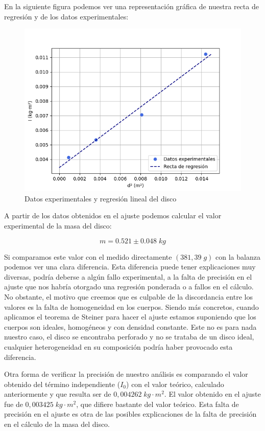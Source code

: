 \documentclass[a4paper,12pt,titlepage]{report}
\begin{document}
En la siguiente figura podemos ver una representación gráfica de nuestra recta de regresión y de los datos experimentales:

\begin{figure}[h!]
    \centering
    \includegraphics[width=0.85\linewidth]{Images/regSteiner1.png}
    \caption{Datos experimentales y regresión lineal del disco}
\end{figure}

A partir de los datos obtenidos en el ajuste podemos calcular el valor experimental de la masa del disco:

\begin{equation}
    m = 0.521 \pm 0.048 \; kg
\end{equation}

Si comparamos este valor con el medido directamente $(381,39 \;g)$ con la balanza podemos ver una clara diferencia. Esta diferencia puede tener explicaciones muy diversas, podría deberse a algún fallo experimental, a la falta de precisión en el ajuste que nos habría otorgado una regresión ponderada o a fallos en el cálculo. No obstante, el motivo que creemos que es culpable de la discordancia entre los valores es la falta de homogeneidad en los cuerpos. Siendo más concretos, cuando aplicamos el teorema de Steiner para hacer el ajuste estamos suponiendo que los cuerpos son ideales, homogéneos y con densidad constante. Este no es para nada nuestro caso, el disco se encontraba perforado y no se trataba de un disco ideal, cualquier heterogeneidad en su composición podría haber provocado esta diferencia.

\par Otra forma de verificar la precisión de nuestro análisis es comparando el valor obtenido del término independiente ($I_0$) con el valor teórico, calculado anteriormente y que resulta ser de $0,004262 \; kg \cdot m^2$. El valor obtenido en el ajuste fue de $0,003425 \; kg \cdot m^2$, que difiere bastante del valor teórico. Esta falta de precisión en el ajuste es otra de las posibles explicaciones de la falta de precisión en el cálculo de la masa del disco.
\end{document}
